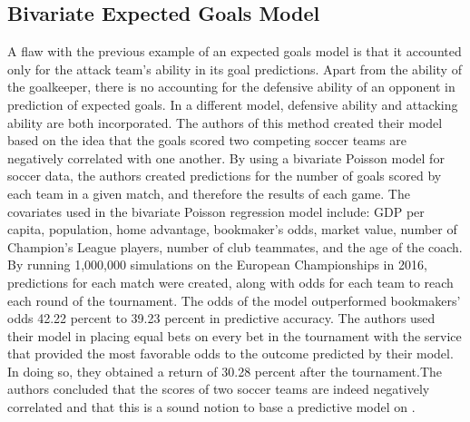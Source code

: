 \documentclass[sigconf]{acmart}
\begin{document}
\subsection{Bivariate Expected Goals Model}
A flaw with the previous example of an expected goals model is that it accounted only for the attack team's ability in its goal predictions. Apart from the ability of the goalkeeper, there is no accounting for the defensive ability of an opponent in prediction of expected goals. In a different model, defensive ability and attacking ability are both incorporated. The authors of this method created their model based on the idea that the goals scored two competing soccer teams are negatively correlated with one another. By using a bivariate Poisson model for soccer data, the authors created predictions for the number of goals scored by each team in a given match, and therefore the results of each game\cite{BivariateExpected}. The covariates used in the bivariate Poisson regression model include: GDP per capita, population, home advantage, bookmaker's odds, market value, number of Champion's League players, number of club teammates, and the age of the coach. By running 1,000,000 simulations on the European Championships in 2016, predictions for each match were created, along with odds for each team to reach each round of the tournament. The odds of the model outperformed bookmakers' odds 42.22 percent to 39.23 percent in predictive accuracy\cite{BivariateExpected}. The authors used their model in placing equal bets on every bet in the tournament with the service that provided the most favorable odds to the outcome predicted by their model. In doing so, they obtained a return of 30.28 percent after the tournament.The authors concluded that the scores of two soccer teams are indeed negatively correlated and that this is a sound notion to base a predictive model on \cite{BivariateExpected}.
\end{document}
